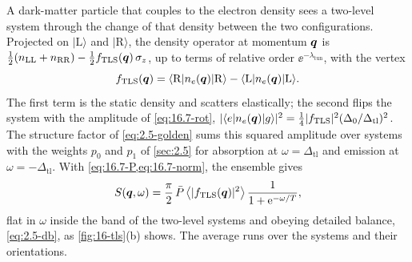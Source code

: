 A dark-matter particle that couples to the electron density sees a two-level system through the change of that density between the two configurations. Projected on $|\mathrm{L}\rangle$ and $|\mathrm{R}\rangle$, the density operator at momentum $\bm{q}$ is $\tfrac12(n_{\mathrm{LL}} + n_{\mathrm{RR}}) - \tfrac12f_{\mathrm{TLS}}(\bm{q})\,\sigma_z$, up to terms of relative order $\ee^{-\lambda_{\mathrm{tun}}}$, with the vertex
\begin{equation}
  f_{\mathrm{TLS}}(\bm{q}) = \langle\mathrm{R}|n_e(\bm{q})|\mathrm{R}\rangle - \langle\mathrm{L}|n_e(\bm{q})|\mathrm{L}\rangle .
  \label{eq:16.7-f}
\end{equation}
The first term is the static density and scatters elastically; the second flips the system with the amplitude of \cref{eq:16.7-rot}, $|\langle e|n_e(\bm{q})|g\rangle|^2 = \tfrac14|f_{\mathrm{TLS}}|^2(\Delta_0/\Delta_{\mathrm{tl}})^2$. The structure factor of \cref{eq:2.5-golden} sums this squared amplitude over systems with the weights $p_0$ and $p_1$ of \cref{sec:2.5} for absorption at $\omega = \Delta_{\mathrm{tl}}$ and emission at $\omega = -\Delta_{\mathrm{tl}}$. With \cref{eq:16.7-P,eq:16.7-norm}, the ensemble gives
\begin{equation}
  S(\bm{q},\omega) = \frac{\pi}{2}\,\bar P\,\bigl\langle|f_{\mathrm{TLS}}(\bm{q})|^2\bigr\rangle\,\frac{1}{1 + \mathrm{e}^{-\omega/T}} ,
  \label{eq:16.7-S}
\end{equation}
flat in $\omega$ inside the band of the two-level systems and obeying detailed balance, \cref{eq:2.5-db}, as \cref{fig:16-tls}(b) shows. The average runs over the systems and their orientations.

